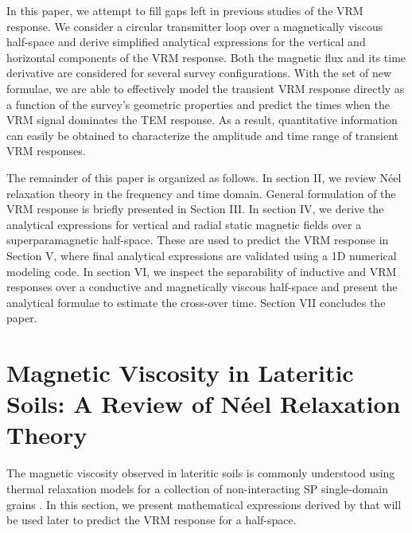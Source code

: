\documentclass[onecolumn]{IEEEtran} %
\begin{document}
In this paper, we attempt to fill gaps left in previous studies of the VRM response. We consider a circular transmitter loop over a magnetically viscous half-space and derive simplified analytical expressions for the vertical and horizontal components of the VRM response. Both the magnetic flux and its time derivative are considered for several survey configurations. With the set of new formulae, we are able to effectively model the transient VRM response directly as a function of the survey's geometric properties and predict the times when the VRM signal dominates the TEM response. As a result, quantitative information can easily be obtained to characterize the amplitude and time range of transient VRM responses.

The remainder of this paper is organized as follows. In section II, we review N\'{e}el relaxation theory in the frequency and time domain. General formulation of the VRM response is briefly presented in Section III. In section IV, we derive the analytical expressions for vertical and radial static magnetic fields over a superparamagnetic half-space. These are used to predict the VRM response in Section V, where final analytical expressions are validated using a 1D numerical modeling code. In section VI, we inspect the separability of inductive and VRM responses over a conductive and magnetically viscous half-space and present the analytical formulae to estimate the cross-over time. Section VII concludes the paper.





\section{Magnetic Viscosity in Lateritic Soils: A Review of N\'{e}el Relaxation Theory}
\label{secAfterEffect}
The magnetic viscosity observed in lateritic soils is commonly understood using thermal relaxation models \citep{Neel1949} for a collection of non-interacting SP single-domain grains \citep{Buselli1982,Moskowitz1985,Dabas1992,Pasion2002,Billings2003,Pasion2007}. In this section, we present mathematical expressions derived by \cite{Neel1949} that will be used later to predict the VRM response for a half-space.

\end{document}
